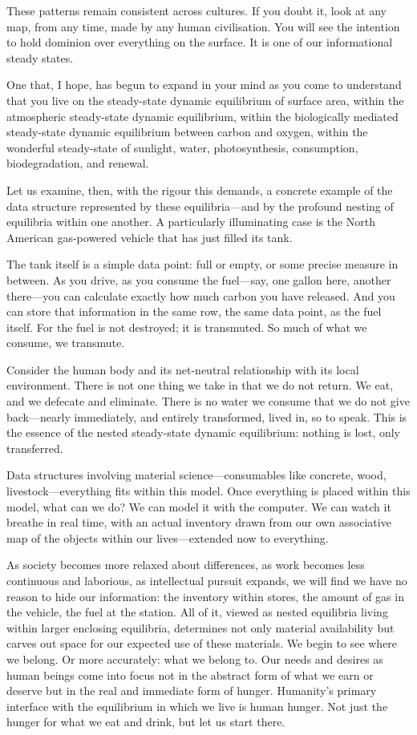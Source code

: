 These patterns remain consistent across cultures. If you doubt it, look at any map, from any time, made by any human civilisation. You will see the intention to hold dominion over everything on the surface. It is one of our informational steady states.

One that, I hope, has begun to expand in your mind as you come to understand that you live on the steady-state dynamic equilibrium of surface area, within the atmospheric steady-state dynamic equilibrium, within the biologically mediated steady-state dynamic equilibrium between carbon and oxygen, within the wonderful steady-state of sunlight, water, photosynthesis, consumption, biodegradation, and renewal.

Let us examine, then, with the rigour this demands, a concrete example of the data structure represented by these equilibria—and by the profound nesting of equilibria within one another. A particularly illuminating case is the North American gas-powered vehicle that has just filled its tank.

The tank itself is a simple data point: full or empty, or some precise measure in between. As you drive, as you consume the fuel—say, one gallon here, another there—you can calculate exactly how much carbon you have released. And you can store that information in the same row, the same data point, as the fuel itself. For the fuel is not destroyed; it is transmuted. So much of what we consume, we transmute.

Consider the human body and its net-neutral relationship with its local environment. There is not one thing we take in that we do not return. We eat, and we defecate and eliminate. There is no water we consume that we do not give back—nearly immediately, and entirely transformed, lived in, so to speak. This is the essence of the nested steady-state dynamic equilibrium: nothing is lost, only transferred.

Data structures involving material science—consumables like concrete, wood, livestock—everything fits within this model. Once everything is placed within this model, what can we do? We can model it with the computer. We can watch it breathe in real time, with an actual inventory drawn from our own associative map of the objects within our lives—extended now to everything.

As society becomes more relaxed about differences, as work becomes less continuous and laborious, as intellectual pursuit expands, we will find we have no reason to hide our information: the inventory within stores, the amount of gas in the vehicle, the fuel at the station. All of it, viewed as nested equilibria living within larger enclosing equilibria, determines not only material availability but carves out space for our expected use of these materials. We begin to see where we belong. Or more accurately: what we belong to. Our needs and desires as human beings come into focus not in the abstract form of what we earn or deserve but in the real and immediate form of hunger. Humanity’s primary interface with the equilibrium in which we live is human hunger. Not just the hunger for what we eat and drink, but let us start there.

